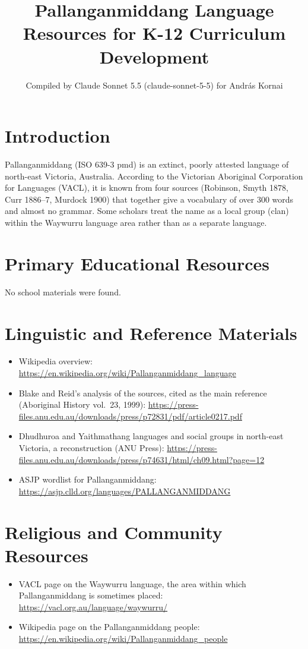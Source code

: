 \documentclass[12pt]{article}
\title{Pallanganmiddang Language Resources for K-12 Curriculum Development}
\author{Compiled by Claude Sonnet 5.5 (claude-sonnet-5-5) for Andr\'as Kornai}
\date{}
\begin{document}
\maketitle

\section{Introduction}
Pallanganmiddang (ISO 639-3 pmd) is an extinct, poorly attested language of north-east Victoria, Australia. According to the Victorian Aboriginal Corporation for Languages (VACL), it is known from four sources (Robinson, Smyth 1878, Curr 1886--7, Murdock 1900) that together give a vocabulary of over 300 words and almost no grammar. Some scholars treat the name as a local group (clan) within the Waywurru language area rather than as a separate language.

\section{Primary Educational Resources}
No school materials were found.

\section{Linguistic and Reference Materials}
\begin{itemize}
\item Wikipedia overview: \url{https://en.wikipedia.org/wiki/Pallanganmiddang_language}
\item Blake and Reid's analysis of the sources, cited as the main reference (Aboriginal History vol.\ 23, 1999): \url{https://press-files.anu.edu.au/downloads/press/p72831/pdf/article0217.pdf}
\item Dhudhuroa and Yaithmathang languages and social groups in north-east Victoria, a reconstruction (ANU Press): \url{https://press-files.anu.edu.au/downloads/press/p74631/html/ch09.html?page=12}
\item ASJP wordlist for Pallanganmiddang: \url{https://asjp.clld.org/languages/PALLANGANMIDDANG}
\end{itemize}

\section{Religious and Community Resources}
\begin{itemize}
\item VACL page on the Waywurru language, the area within which Pallanganmiddang is sometimes placed: \url{https://vacl.org.au/language/waywurru/}
\item Wikipedia page on the Pallanganmiddang people: \url{https://en.wikipedia.org/wiki/Pallanganmiddang_people}
\end{itemize}
\end{document}
